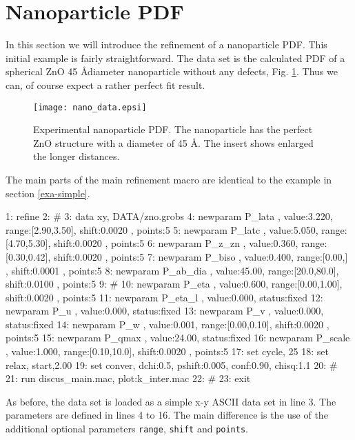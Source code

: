 \section{Nanoparticle PDF \label{exa-nano}}

In this section we will introduce the refinement of a nanoparticle PDF. This
initial example is fairly straightforward. The data set is the calculated PDF
of a spherical ZnO 45 \AA diameter nanoparticle without any defects, Fig.
\ref{fexa-nano-exp}. Thus we can, of course expect a rather perfect fit result.

\begin{figure}
   \texttt{[image: nano\_data.epsi]}
   \caption{Experimental nanoparticle PDF. The nanoparticle has the perfect
   ZnO structure with a diameter of 45 \AA. The insert shows enlarged the
   longer distances.}
   \label{fexa-nano-exp}
\end{figure}

The main parts of the main refinement macro are identical to the example
in section \ref{exa-simple}. 

\begin{MacVerbatim}
 1: refine
 2: #
 3: data xy, DATA/zno.grobs
 4: newparam  P_lata   , value:3.220, range:[2.90,3.50], shift:0.0020 , points:5
 5: newparam  P_latc   , value:5.050, range:[4.70,5.30], shift:0.0020 , points:5
 6: newparam  P_z_zn   , value:0.360, range:[0.30,0.42], shift:0.0020 , points:5
 7: newparam  P_biso   , value:0.400, range:[0.00,]    , shift:0.0001 , points:5
 8: newparam  P_ab_dia , value:45.00, range:[20.0,80.0], shift:0.0100 , points:5
 9: #
10: newparam  P_eta    , value:0.600, range:[0.00,1.00], shift:0.0020 , points:5
11: newparam  P_eta_l  , value:0.000, status:fixed
12: newparam  P_u      , value:0.000, status:fixed
13: newparam  P_v      , value:0.000, status:fixed
14: newparam  P_w      , value:0.001, range:[0.00,0.10], shift:0.0020 , points:5
15: newparam  P_qmax   , value:24.00, status:fixed
16: newparam  P_scale  , value:1.000, range:[0.10,10.0], shift:0.0020 , points:5
17: set cycle,  25
18: set relax, start,2.00
19: set conver, dchi:0.5, pshift:0.005, conf:0.90, chisq:1.1
20: #
21: run discus_main.mac, plot:k_inter.mac
22: #
23: exit
\end{MacVerbatim}

As before, the data set is loaded as a simple x-y ASCII data set in line 3.
The parameters are defined in lines 4 to 16. The main difference is the use 
of the additional optional parameters {\tt range}, {\tt shift} and {\tt points}.

